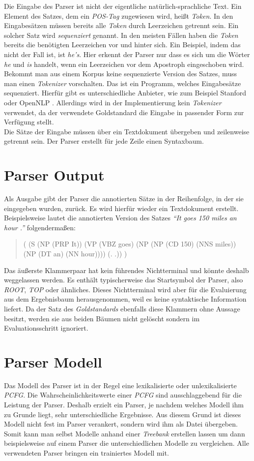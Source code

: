 Die Eingabe des Parser ist nicht der eigentliche natürlich-sprachliche Text. Ein Element des Satzes, dem ein \textit{POS-Tag} zugewiesen wird, heißt \textit{Token}. In den Eingabesätzen müssen bereits alle \textit{Token} durch Leerzeichen getrennt sein. Ein solcher Satz wird \textit{sequenziert} genannt. In den meisten Fällen haben die \textit{Token} bereits die benötigten Leerzeichen vor und hinter sich. Ein Beispiel, indem das nicht der Fall ist, ist \textit{he's}. Hier erkennt der Parser nur dass es sich um die Wörter \textit{he} und \textit{is} handelt, wenn ein Leerzeichen vor dem Apostroph eingeschoben wird. Bekommt man aus einem Korpus keine sequenzierte Version des Satzes, muss man einen \textit{Tokenizer} vorschalten. Das ist ein Programm, welches Eingabesätze sequenziert. Hierfür gibt es unterschiedliche Anbieter, wie zum Beispiel Stanford \cite{stanfordTokenizer} oder OpenNLP \cite{openNlpManual}. 
Allerdings wird in der Implementierung kein \textit{Tokenizer} verwendet, da der verwendete Goldstandard die Eingabe in passender Form zur Verfügung stellt. \\
Die Sätze der Eingabe müssen über ein Textdokument übergeben und zeilenweise getrennt sein. Der Parser erstellt für jede Zeile einen Syntaxbaum.

\section{Parser Output}
Als Ausgabe gibt der Parser die annotierten Sätze in der Reihenfolge, in der sie eingegeben wurden, zurück. Es wird hierfür wieder ein Textdokument erstellt. 
Beispielsweise lautet die annotierten Version des Satzes \textit{``It goes 150 miles an hour .''} folgendermaßen:
\begin{quote}
( (S (NP (PRP It)) (VP (VBZ goes) (NP (NP (CD 150) (NNS miles)) \\(NP (DT an) (NN hour)))) (. .)) )
\end{quote}
Das äußerste Klammerpaar hat kein führendes Nichtterminal und könnte deshalb weggelassen werden. Es enthält typischerweise das Startsymbol der Parser, also \textit{ROOT}, \textit{TOP} oder ähnliches. Dieses Nichtterminal wird aber für die Evaluierung aus dem Ergebnisbaum herausgenommen, weil es keine syntaktische Information liefert. Da der Satz des \textit{Goldstandards} ebenfalls diese Klammern ohne Aussage besitzt, werden sie aus beiden Bäumen nicht gelöscht sondern im Evaluationsschritt ignoriert.
\section{Parser Modell}
Das Modell des Parser ist in der Regel eine lexikalisierte oder unlexikalisierte \textit{PCFG}. Die Wahrscheinlichkeitswerte einer \textit{PCFG} sind ausschlaggebend für die Leistung der Parser. Deshalb  erzielt ein Parser, je nachdem welches Modell ihm zu Grunde liegt, sehr unterschiedliche Ergebnisse. Aus diesem Grund ist dieses Modell nicht fest im Parser verankert, sondern wird ihm als Datei übergeben. Somit kann man selbst Modelle anhand einer \textit{Treebank} erstellen lassen um dann beispielsweise auf einem Parser die unterschiedlichen Modelle zu vergleichen. Alle verwendeten Parser bringen ein trainiertes Modell mit. 

